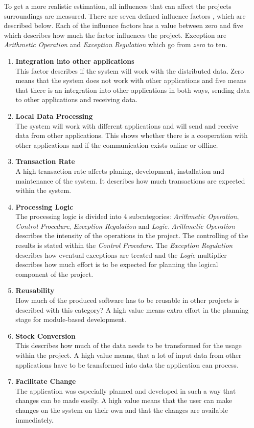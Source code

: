 To get a more realistic estimation, all influences that can affect the projects surroundings are measured. There are seven defined influence factors \cite{Softwaremanagement}, which are described below. Each of the influence factors has a value between zero and five which describes how much the factor influences the project. Exception are \textit{Arithmetic Operation} and \textit{Exception Regulation} which go from \textit{zero} to {ten}.\\

\begin{enumerate}
	\item \textbf{Integration into other applications}\\This factor describes if the system will work with the distributed data. Zero means that the system does not work with other applications and five means that there is an integration into other applications in both ways, sending data to other applications and receiving data.
	\item \textbf{Local Data Processing}\\The system will work with different applications and will send and receive data from other applications. This shows whether there is a cooperation with other applications and if the communication exists online or offline.
	\item \textbf{Transaction Rate}\\A high transaction rate affects planing, development, installation and maintenance of the system. It describes how much transactions are expected within the system.
	\item \textbf{Processing Logic}\\The processing logic is divided into 4 subcategories: \textit{Arithmetic Operation}, \textit{Control Procedure}, \textit{Exception Regulation} and \textit{Logic}. \textit{Arithmetic Operation} describes the intensity of the operations in the project. The controlling of the results is stated within the \textit{Control Procedure}. The \textit{Exception Regulation} describes how eventual exceptions are treated and the \textit{Logic} multiplier describes how much effort is to be expected for planning the logical component of the project.
	\item \textbf{Reusability}\\ How much of the produced software has to be reusable in other projects is described with this category? A high value means extra effort in the planning stage for module-based development.
	\item \textbf{Stock Conversion}\\ This describes how much of the data needs to be transformed for the usage within the project. A high value means, that a lot of input data from other applications have to be transformed into data the application can process.
	\item \textbf{Facilitate Change}\\ The application was especially planned and developed in such a way that changes can be made easily. A high value means that the user can make changes on the system on their own and that the changes are available immediately.
\end{enumerate}
